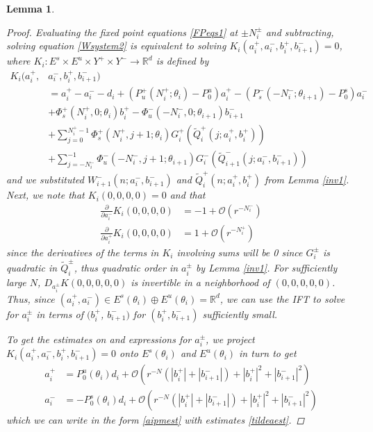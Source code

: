 \documentclass[12pt]{article}
\def\R{{\mathbb R}}
\newtheorem{lemma}{Lemma}
\begin{document}
\begin{lemma}
\begin{proof}
Evaluating the fixed point equations \eqref{FPeqs1} at $\pm N_i^\pm$ and subtracting, solving equation \eqref{Wsystem2} is equivalent to solving $K_i(a_i^+, a_i^-, b_i^+, b_{i+1}^-) = 0$, where $K_i: E^s \times E^u \times Y^+ \times Y^- \rightarrow \R^d$ is defined by
\begin{align*}
K_i(a_i^+, &a_i^-, b_i^+, b_{i+1}^-) \\
&= a_i^+ - a_i^- - d_i + (P_u^+(N_i^+; \theta_i) - P_0^u) a_i^+ - (P_s^-(-N_i^-; \theta_{i+1}) - P_0^s) a_i^- \\
&+ \Phi_s^+(N_i^+, 0; \theta_i) b_i^+ - \Phi_u^-(-N_i^-, 0; \theta_{i+1}) b_{i+1}^- \\
&+ \sum_{j = 0}^{N_i^+-1} \Phi_s^+(N_i^+, j+1; \theta_i) G_i^+(\tilde{Q}_i^+(j; a_i^+, b_i^+)) \\
&+ \sum_{j = -N_i^-}^{-1} \Phi_u^-(-N_i^-, j+1; \theta_{i+1}) G_i^-(\tilde{Q}_{i+1}^-(j; a_i^-, b_{i+1}^-))
\end{align*}
and we substituted $W_{i+1}^-(n; a_i^-, b_{i+1}^-)$ and $\tilde{Q}_i^+(n; a_i^+, b_i^+)$ from Lemma \ref{inv1}. Next, we note that $K_i(0,0,0,0) = 0$ and that 
\begin{align*}
\frac{\partial}{\partial a_i^-} K_i(0, 0, 0, 0) &= -1 + \mathcal{O}(r^{-N_i^-}) \\
\frac{\partial}{\partial a_i^+} K_i(0, 0, 0, 0) &= 1 + \mathcal{O}(r^{-N_i^+})
\end{align*}
since the derivatives of the terms in $K_i$ involving sums will be 0 since $G_i^\pm$ is quadratic in $\tilde{Q}_i^\pm$, thus quadratic order in $a_i^\pm$ by Lemma \ref{inv1}. For sufficiently large $N$, $D_{a_i^\pm} K(0, 0, 0, 0, 0)$ is invertible in a neighborhood of $(0, 0, 0, 0, 0)$. Thus, since $(a_i^+, a_i^-) \in E^s(\theta_i) \oplus E^u(\theta_i) = \R^d$, we can use the IFT to solve for $a_i^\pm$ in terms of $(b_i^+$, $b_{i+1}^-)$ for $(b_i^+, b_{i+1}^-)$ sufficiently small.

To get the estimates on and expressions for $a_i^\pm$, we project $K_i(a_i^+, a_i^-, b_i^+, b_{i+1}^-) = 0$ onto $E^s(\theta_i)$ and $E^u(\theta_i)$ in turn to get 
\begin{align*}
a_i^+ &= P_0^u(\theta_i) d_i + \mathcal{O}(r^{-N}(|b_i^+|+|b_{i+1}^-|) + |b_i^+|^2+|b_{i+1}^-|^2) \\
a_i^- &= -P_0^s(\theta_i) d_i + \mathcal{O}(r^{-N}(|b_i^+|+|b_{i+1}^-|) + |b_i^+|^2+|b_{i+1}^-|^2)
\end{align*}
which we can write in the form \eqref{aipmest} with estimates \eqref{tildeaest}. 


\end{proof}
\end{lemma}
\end{document}
